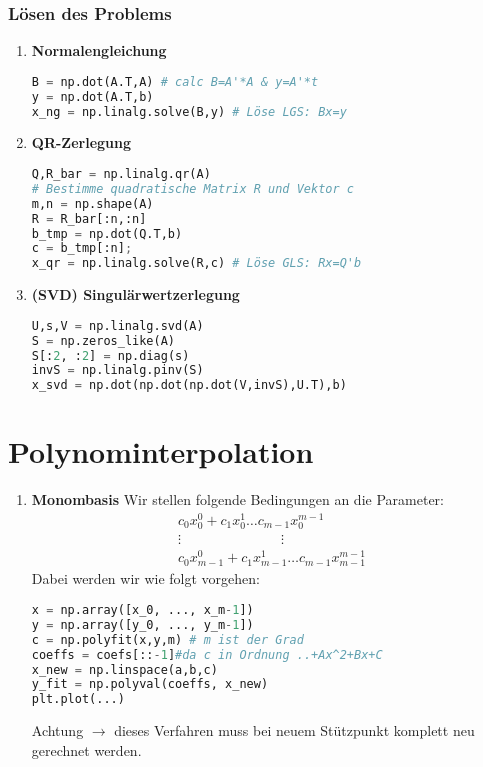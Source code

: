 \documentclass{sciposter}
\begin{document}
\begin{multicols}{3}
\subsubsection*{Lösen des Problems}
\begin{enumerate}
	\item \textbf{Normalengleichung}
	\begin{lstlisting}[language=Python]
B = np.dot(A.T,A) # calc B=A'*A & y=A'*t
y = np.dot(A.T,b)
x_ng = np.linalg.solve(B,y) # Löse LGS: Bx=y
	\end{lstlisting}
	\item \textbf{QR-Zerlegung}
	\begin{lstlisting}[language=Python]
Q,R_bar = np.linalg.qr(A)
# Bestimme quadratische Matrix R und Vektor c
m,n = np.shape(A)
R = R_bar[:n,:n]
b_tmp = np.dot(Q.T,b)
c = b_tmp[:n];
x_qr = np.linalg.solve(R,c) # Löse GLS: Rx=Q'b
	\end{lstlisting}
	\item \textbf{(SVD) Singulärwertzerlegung}
	\begin{lstlisting}[language=Python]
U,s,V = np.linalg.svd(A)  
S = np.zeros_like(A)
S[:2, :2] = np.diag(s)
invS = np.linalg.pinv(S)
x_svd = np.dot(np.dot(np.dot(V,invS),U.T),b)
	\end{lstlisting}
\end{enumerate}


\section{Polynominterpolation}

\begin{enumerate}
	\item \textbf{Monombasis}
	Wir stellen folgende Bedingungen an die Parameter:
	$$\begin{matrix}
	c_0 x_0 ^0 + c_1 x_0 ^1 \dots c_{m-1}x_0 ^{m-1} \\
		\vdots  \hspace{3cm} \vdots \\
	c_0 x_{m-1}^0 + c_1 x_{m-1}^1 \dots c_{m-1}x_{m-1}^{m-1}
	\end{matrix} $$
Dabei werden wir wie folgt vorgehen:
\begin{lstlisting}[language=Python]
x = np.array([x_0, ..., x_m-1])
y = np.array([y_0, ..., y_m-1])
c = np.polyfit(x,y,m) # m ist der Grad
coeffs = coefs[::-1]#da c in Ordnung ..+Ax^2+Bx+C 
x_new = np.linspace(a,b,c)
y_fit = np.polyval(coeffs, x_new) 
plt.plot(...)
\end{lstlisting}
Achtung $\rightarrow$ dieses Verfahren muss bei neuem Stützpunkt komplett neu gerechnet werden.
	

\end{enumerate}
\end{multicols}
\end{document}

